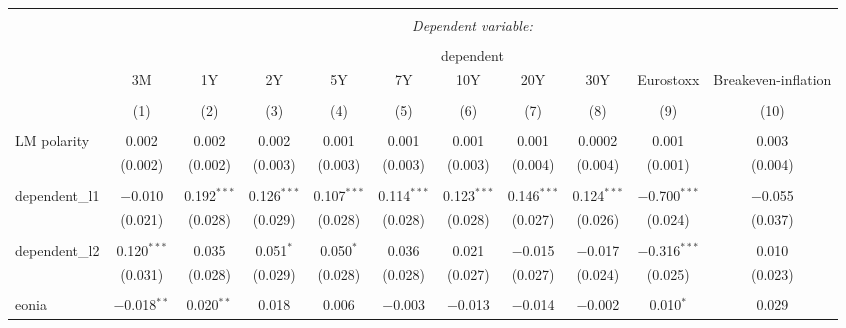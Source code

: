 

\begin{table}[!htbp] \centering 
  \caption{} 
  \label{} 
  \begin{adjustbox}{width=1.35\textwidth}
\begin{tabular}{@{\extracolsep{5pt}}lcccccccccc} 
\\[-1.8ex]\hline 
\hline \\[-1.8ex] 
 & \multicolumn{10}{c}{\textit{Dependent variable:}} \\ 
\cline{2-11} 
\\[-1.8ex] & \multicolumn{10}{c}{dependent} \\ 
 & 3M & 1Y & 2Y & 5Y & 7Y & 10Y & 20Y & 30Y & Eurostoxx & Breakeven-inflation \\ 
\\[-1.8ex] & (1) & (2) & (3) & (4) & (5) & (6) & (7) & (8) & (9) & (10)\\ 
\hline \\[-1.8ex] 
 LM polarity & 0.002 & 0.002 & 0.002 & 0.001 & 0.001 & 0.001 & 0.001 & 0.0002 & 0.001 & 0.003 \\ 
  & (0.002) & (0.002) & (0.003) & (0.003) & (0.003) & (0.003) & (0.004) & (0.004) & (0.001) & (0.004) \\ 
  & & & & & & & & & & \\ 
 dependent\_l1 & $-$0.010 & 0.192$^{***}$ & 0.126$^{***}$ & 0.107$^{***}$ & 0.114$^{***}$ & 0.123$^{***}$ & 0.146$^{***}$ & 0.124$^{***}$ & $-$0.700$^{***}$ & $-$0.055 \\ 
  & (0.021) & (0.028) & (0.029) & (0.028) & (0.028) & (0.028) & (0.027) & (0.026) & (0.024) & (0.037) \\ 
  & & & & & & & & & & \\ 
 dependent\_l2 & 0.120$^{***}$ & 0.035 & 0.051$^{*}$ & 0.050$^{*}$ & 0.036 & 0.021 & $-$0.015 & $-$0.017 & $-$0.316$^{***}$ & 0.010 \\ 
  & (0.031) & (0.028) & (0.029) & (0.028) & (0.028) & (0.027) & (0.027) & (0.024) & (0.025) & (0.023) \\ 
  & & & & & & & & & & \\ 
 eonia & $-$0.018$^{**}$ & 0.020$^{**}$ & 0.018 & 0.006 & $-$0.003 & $-$0.013 & $-$0.014 & $-$0.002 & 0.010$^{*}$ & 0.029 \\ 

\end{tabular}
\end{adjustbox}
\end{table}
